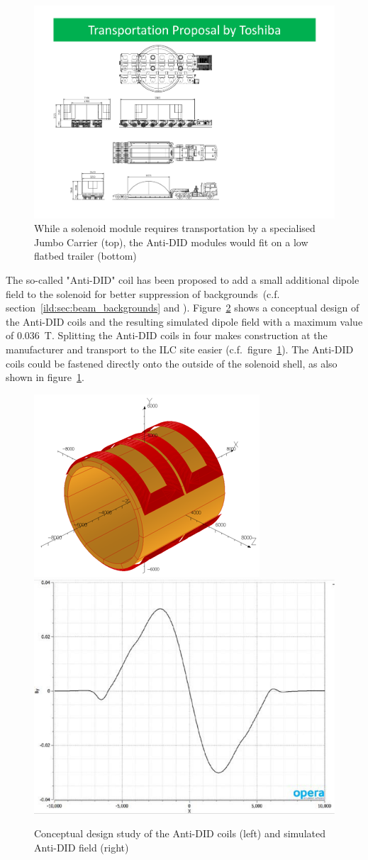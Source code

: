 \begin{figure}[h!]
    \centering
    \includegraphics[width=0.8\hsize]{Integration/fig/Magnet_Transport.pdf}
    \caption{While a solenoid module requires transportation by a specialised Jumbo Carrier (top), the Anti-DID modules would fit on a low flatbed trailer (bottom)~\cite{ild:bib:Solenoid_Manufacturing}}
    \label{ILD:fig:magnet_transport}
\end{figure}

The so-called "Anti-DID" coil has been proposed to add a small additional dipole field to the solenoid for better suppression of backgrounds~(c.f. section~\ref{ild:sec:beam_backgrounds} and \cite{ild:bib:anti-did}). Figure~\ref{ILD:fig:anti_did_design} shows a conceptual design of the Anti-DID coils and the resulting simulated dipole field with a maximum value of 0.036~T. Splitting the Anti-DID coils in four makes construction at the manufacturer and transport to the ILC site easier (c.f.~figure~\ref{ILD:fig:magnet_transport}). The Anti-DID coils could be fastened directly onto the outside of the solenoid shell, as also shown in figure~\ref{ILD:fig:magnet_transport}.

\begin{figure}[h!]
    \centering
    \includegraphics[width=0.4\hsize]{Integration/fig/Anti-DID.png}
    \includegraphics[width=0.4\hsize]{Integration/fig/Anti-DID_Field.pdf}
    \caption{Conceptual design study of the Anti-DID coils (left) and simulated Anti-DID field (right)~\cite{ild:bib:anti-did-design}}
    \label{ILD:fig:anti_did_design} 
\end{figure}

